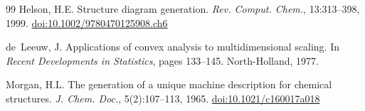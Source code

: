 \documentclass[twocolumn]{article}
\begin{document}
\begin{thebibliography}{99}
Helson, H.E.
\newblock Structure diagram generation.
\newblock \emph{Rev. Comput. Chem.}, 13:313--398, 1999.
\newblock \href{https://doi.org/10.1002/9780470125908.ch6}{doi:10.1002/9780470125908.ch6}

de~Leeuw, J.
\newblock Applications of convex analysis to multidimensional scaling.
\newblock In \emph{Recent Developments in Statistics}, pages 133--145.
  North-Holland, 1977.

Morgan, H.L.
\newblock The generation of a unique machine description for chemical structures.
\newblock \emph{J. Chem. Doc.}, 5(2):107--113, 1965.
\newblock \href{https://doi.org/10.1021/c160017a018}{doi:10.1021/c160017a018}

\end{thebibliography}
\end{document}
